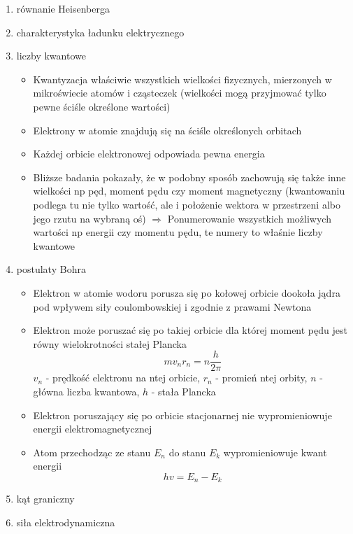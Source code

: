 \documentclass[12pt,a4paper]{article}
\begin{document}
\begin {enumerate}

\item równanie Heisenberga

\item charakterystyka ładunku elektrycznego

\item liczby kwantowe

 \begin{itemize}
 	\item Kwantyzacja właściwie wszystkich wielkości fizycznych, mierzonych w mikroświecie atomów i cząsteczek (wielkości mogą przyjmować tylko pewne ściśle określone wartości)
 	\item Elektrony w atomie znajdują się na ściśle określonych orbitach
 	\item Każdej orbicie elektronowej odpowiada pewna energia
 	\item Bliższe badania pokazały, że w podobny sposób zachowują się także inne wielkości np pęd, moment pędu czy moment magnetyczny (kwantowaniu podlega tu nie tylko wartość, ale i położenie wektora w przestrzeni albo jego rzutu na wybraną oś) $\Rightarrow$ Ponumerowanie wszystkich możliwych wartości np energii czy momentu pędu, te numery to właśnie liczby kwantowe
 \end{itemize}

\item postulaty Bohra

 \begin{itemize}
 	\item Elektron w atomie wodoru porusza się po kołowej orbicie dookoła jądra pod wpływem siły coulombowskiej i zgodnie z prawami Newtona
 	\item Elektron może poruszać się po takiej orbicie dla której moment pędu jest równy wielokrotności stałej Plancka
 	$$mv_nr_n=n\frac{h}{2\pi}$$
 	$v_n$ - prędkość elektronu na ntej orbicie, $r_n$ - promień ntej orbity, $n$ - główna liczba kwantowa, $h$ - stała Plancka
 	\item Elektron poruszający się po orbicie stacjonarnej nie wypromieniowuje energii elektromagnetycznej
 	\item Atom przechodząc ze stanu $E_n$ do stanu $E_k$ wypromieniowuje kwant energii
 	$$hv = E_n-E_k$$
 \end{itemize}

\item kąt graniczny

\item siła elektrodynamiczna


\end{enumerate}
\end{document}
